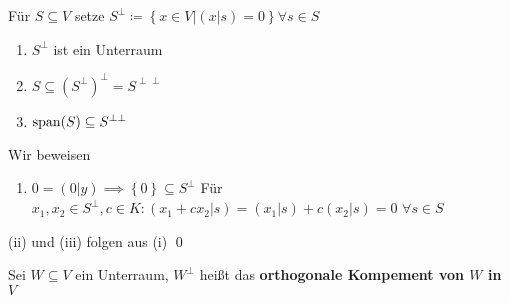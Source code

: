 \begin{subdefinition*}[Notation]
	Für $ S \subseteq V $ setze $ S^{\perp} \coloneqq \left\{ x \in V | (x|s) = 0 \right\} \forall s \in S $
\end{subdefinition*}

\begin{subnote}
	\begin{enumerate}[label=(\roman*)]
		\item $ S^{\perp}  $ ist ein Unterraum
		\item $ S \subseteq \left( S^{\perp}  \right) ^{\perp} = S^{\perp\perp}  $ 
		\item $ \operatorname{span}  (S) \subseteq S^{\bot\bot} $
	\end{enumerate}
\end{subnote}
\begin{subproof*}
	Wir beweisen
	\begin{enumerate}[label=(\roman*)]
		\item $ 0 = (0|y) \implies \left\{ 0 \right\} \subseteq S^{\perp}  $
			Für $ x_1, x_2 \in S^{\perp} , c \in K : \left( x_1 + cx_2 | s \right) = (x_1|s) + c(x_2|s) = 0 $ $ \forall s \in S $
	\end{enumerate}
	(ii) und (iii) folgen aus (i) \qed
\end{subproof*}

\begin{subdefinition}
	Sei $ W \subseteq V $ ein Unterraum, $ W^{\perp}  $ heißt das \textbf{orthogonale Kompement von $ W $ in $ V $}
\end{subdefinition}

